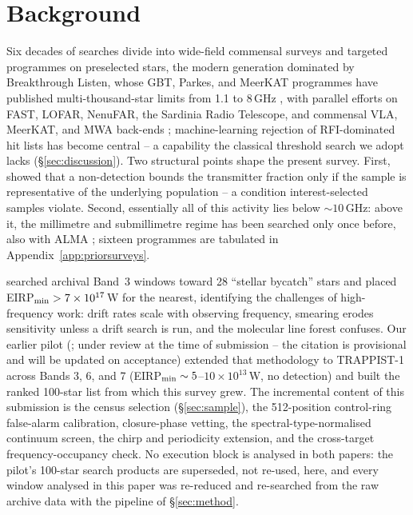 \documentclass{openjournal}
\begin{document}
\section{Background}
\label{sec:background}

Six decades of searches divide into wide-field commensal surveys and
targeted programmes on preselected stars, the modern generation
dominated by Breakthrough Listen, whose GBT, Parkes, and MeerKAT
programmes have published multi-thousand-star limits from 1.1 to
8\,GHz \citep{BLoverview,Enriquez2017,Price2020,BLMeerKAT2026}, with
parallel efforts on FAST, LOFAR, NenuFAR, the Sardinia Radio
Telescope, and commensal VLA, MeerKAT, and MWA back-ends
\citep{Zhang2020,LOFARdualsite2023,SRT2025,Tremblay2024};
machine-learning rejection of RFI-dominated hit lists has become
central \citep{Ma2023,Choza2024,GLOBULAR2025,AnomalyParkesGBT2025,
BRaTs2026} -- a capability the classical threshold search we adopt
lacks (\S\ref{sec:discussion}). Two structural points shape the
present survey. First, \citet{Margot2023} showed that a non-detection
bounds the transmitter fraction only if the sample is representative
of the underlying population -- a condition interest-selected samples
violate. Second, essentially all of this activity lies below
${\sim}10$\,GHz: above it, the millimetre and submillimetre regime has
been searched only once before, also with ALMA \citep{Mason2024};
sixteen programmes are tabulated in Appendix~\ref{app:priorsurveys}.

\citet{Mason2024} searched archival Band~3 windows toward 28
``stellar bycatch'' stars and placed EIRP$_{\rm min} >
7\times10^{17}$\,W for the nearest, identifying the challenges of
high-frequency work: drift rates scale with observing frequency,
smearing erodes sensitivity unless a drift search is run, and the
molecular line forest confuses. Our earlier pilot
(\citealp{White2026}; under review at the time of submission -- the
citation is provisional and will be updated on acceptance) extended
that methodology to TRAPPIST-1 across Bands 3, 6, and 7
(EIRP$_{\rm min}\sim5$--$10\times10^{13}$\,W, no detection) and built
the ranked 100-star list from which this survey grew. The incremental
content of this submission is the census selection
(\S\ref{sec:sample}), the 512-position control-ring
false-alarm calibration, closure-phase vetting, the
spectral-type-normalised continuum screen, the chirp and periodicity
extension, and the cross-target frequency-occupancy check.
No execution block is analysed in both papers: the pilot's 100-star
search products are superseded, not re-used, here, and every window
analysed in this paper was re-reduced and re-searched from the raw
archive data with the pipeline of \S\ref{sec:method}.
\end{document}
